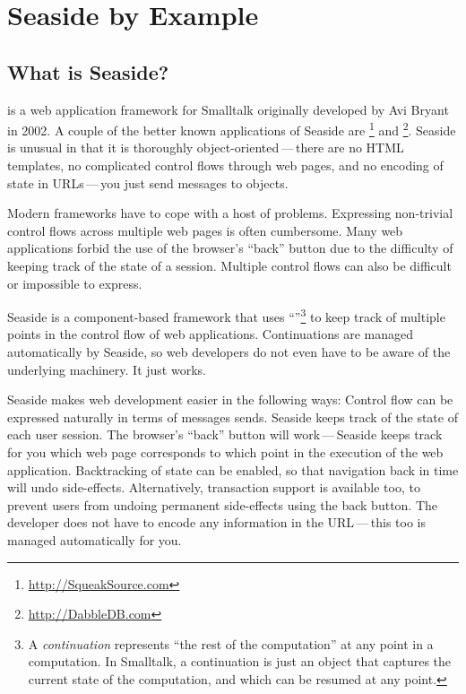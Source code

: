 \documentclass[a4paper,10pt,twoside]{book}
\begin{document}
	\sloppy
\fi
\chapter{Seaside by Example}
\label{cha:seaside}

\section{What is Seaside?}

 is a web application framework for Smalltalk originally developed by Avi Bryant in 2002.
A couple of the better known applications of Seaside are \footnote{\url{http://SqueakSource.com}} and \footnote{\url{http://DabbleDB.com}}.
Seaside is unusual in that it is thoroughly object-oriented\,---\,there are no HTML templates, no complicated control flows through web pages, and no encoding of state in URLs\,---\,you just send messages to objects.

Modern  frameworks have to cope with a host of problems. Expressing non-trivial control flows across multiple web pages is often cumbersome. Many web applications forbid the use of the browser's ``back'' button due to the difficulty of keeping track of the state of a session. Multiple control flows can also be difficult or impossible to express.

Seaside is a component-based framework that uses ``''\footnote{A \emph{continuation} represents ``the rest of the computation'' at any point in a computation. In Smalltalk, a continuation is just an object that captures the current state of the computation, and which can be resumed at any point.} to keep track of multiple points in the control flow of web applications. Continuations are managed automatically by Seaside, so web developers do not even have to be aware of the underlying machinery. It just works.

Seaside makes web development easier in the following ways:
Control flow can be expressed naturally in terms of messages sends.
Seaside keeps track of the state of each user session.
The browser's ``back'' button will work\,---\,Seaside keeps track for you which web page corresponds to which point in the execution of the web application.
Backtracking of state can be enabled, so that navigation back in time will undo side-effects.
Alternatively, transaction support is available too, to prevent users from undoing permanent side-effects using the back button.
The developer does not have to encode any information in the URL\,---\,this too is managed automatically for you.
\end{document}
